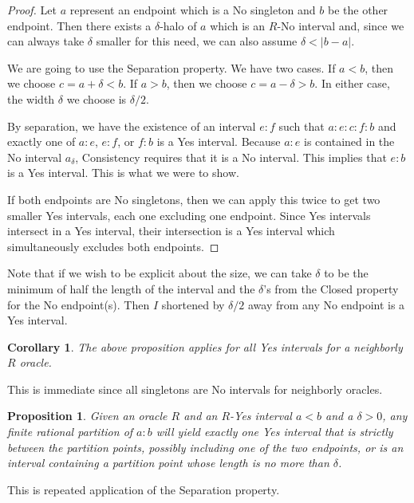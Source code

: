\documentclass[12pt]{article}
\newtheorem{corollary}{Corollary}[subsection]
\newtheorem{proposition}{Proposition}[subsection]
\begin{document}
\begin{proof}
Let $a$ represent an endpoint which is a No singleton and $b$ be the other endpoint. Then there exists a $\delta$-halo of $a$ which is an $R$-No interval and, since we can always take $\delta$ smaller for this need, we can also assume $\delta < |b-a|$. 

We are going to use the Separation property. We have two cases. If $a< b$, then we choose $c = a+ \delta < b$. If $a>b$, then we choose $c = a- \delta > b$. In either case,  the width $\delta$ we choose is $\delta/2$. 

By separation, we have the existence of an interval $e:f$ such that $a:e:c:f:b$ and exactly one of $a:e$, $e:f$, or $f:b$ is a Yes interval. Because $a:e$ is contained in the No interval $a_\delta$, Consistency requires that it is a No interval. This implies that $e:b$ is a Yes interval. This is what we were to show. 

If both endpoints are No singletons, then we can apply this twice to get two smaller Yes intervals, each one excluding one endpoint. Since Yes intervals intersect in a Yes interval, their intersection is a Yes interval which simultaneously excludes both endpoints. 

\end{proof}

Note that if we wish to be explicit about the size, we can take $\delta$ to be the minimum of half the length of the interval and the $\delta$'s from the Closed property for the No endpoint(s). Then $I$ shortened by $\delta/2$ away from any No endpoint is a Yes interval.  

\begin{corollary}
    The above proposition applies for all Yes intervals for a neighborly $R$ oracle. 
\end{corollary}

This is immediate since all singletons are No intervals for neighborly oracles. 

\begin{proposition}\label{pr:multi}
Given an oracle $R$ and an $R$-Yes interval $a\lt b$ and a $\delta>0$, any finite rational partition of $a:b$ will yield exactly one Yes interval that is strictly between the partition points, possibly including one of the two endpoints, or is an interval containing a partition point whose length is no more than $\delta$.
\end{proposition}

This is repeated application of the Separation property. 
\end{document}
